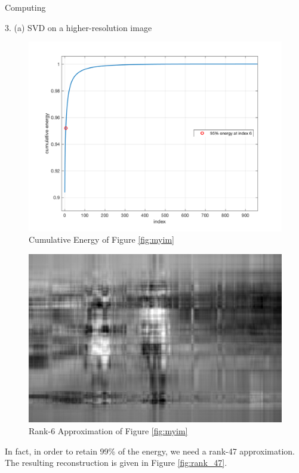 \begin{section}{Computing}
\begin{homeworkSection}{3. (a) SVD on a higher-resolution image}
\begin{figure}[H]
\centering
\includegraphics[width=0.75\columnwidth]{../data/cumulative_energy}
\caption{Cumulative Energy of Figure \ref{fig:myim}}
\label{fig:energy}
\end{figure}

\begin{figure}[H]
\centering
\includegraphics[width=0.90\columnwidth]{../data/rank_6_approx}
\caption{Rank-6 Approximation of Figure \ref{fig:myim}}
\label{fig:rank_6}
\end{figure}

In fact, in order to retain 99\% of the energy, we need a rank-47 approximation. The resulting reconstruction is given in Figure \ref{fig:rank_47}.


\end{homeworkSection}
\end{section}
